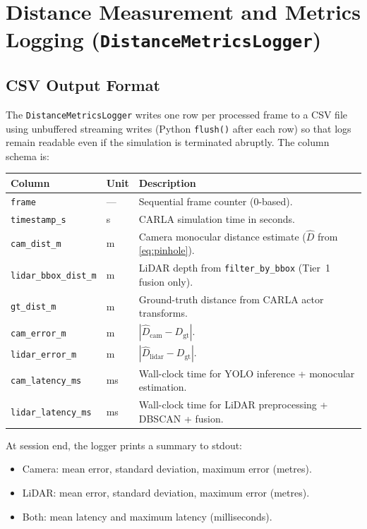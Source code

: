 \documentclass[12pt,a4paper]{article}
\begin{document}
\section{Distance Measurement and Metrics Logging
         (\texttt{DistanceMetricsLogger})}
\label{sec:metrics}

\subsection{CSV Output Format}
\label{subsec:csv_format}

The \texttt{DistanceMetricsLogger} writes one row per processed frame to a
CSV file using unbuffered streaming writes (Python \texttt{flush()} after each
row) so that logs remain readable even if the simulation is terminated
abruptly.  The column schema is:

\begin{center}
\begin{tabular}{@{}ll p{6.5cm}@{}}
\toprule
\textbf{Column} & \textbf{Unit} & \textbf{Description} \\
\midrule
\texttt{frame}            & ---  & Sequential frame counter (0-based). \\
\texttt{timestamp\_s}     & s    & CARLA simulation time in seconds. \\
\texttt{cam\_dist\_m}     & m    & Camera monocular distance estimate ($\hat{D}$ from \cref{eq:pinhole}). \\
\texttt{lidar\_bbox\_dist\_m} & m & LiDAR depth from \texttt{filter\_by\_bbox} (Tier~1 fusion only). \\
\texttt{gt\_dist\_m}      & m    & Ground-truth distance from CARLA actor transforms. \\
\texttt{cam\_error\_m}    & m    & $|\hat{D}_\text{cam} - D_\text{gt}|$. \\
\texttt{lidar\_error\_m}  & m    & $|\hat{D}_\text{lidar} - D_\text{gt}|$. \\
\texttt{cam\_latency\_ms} & ms   & Wall-clock time for YOLO inference + monocular estimation. \\
\texttt{lidar\_latency\_ms} & ms & Wall-clock time for LiDAR preprocessing + DBSCAN + fusion. \\
\bottomrule
\end{tabular}
\end{center}

\noindent
At session end, the logger prints a summary to stdout:
\begin{itemize}[nosep]
  \item Camera: mean error, standard deviation, maximum error (metres).
  \item LiDAR: mean error, standard deviation, maximum error (metres).
  \item Both: mean latency and maximum latency (milliseconds).
\end{itemize}
\end{document}

